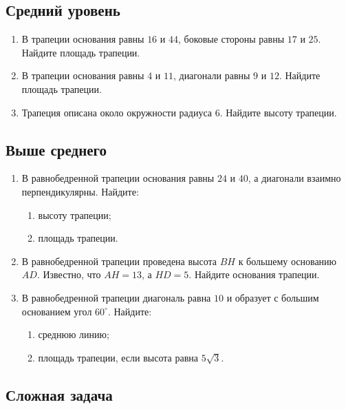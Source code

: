 \documentclass[a4paper,12pt]{article}
\begin{document}
\subsection*{\textcolor{accent}{Средний уровень}}

\begin{enumerate}[label=\textbf{\arabic*.},start=4]
    \item В трапеции основания равны $16$ и $44$, боковые стороны равны $17$ и $25$. Найдите площадь трапеции.

    \item В трапеции основания равны $4$ и $11$, диагонали равны $9$ и $12$. Найдите площадь трапеции.

    \item Трапеция описана около окружности радиуса $6$. Найдите высоту трапеции.
\end{enumerate}

\subsection*{\textcolor{accent}{Выше среднего}}

\begin{enumerate}[label=\textbf{\arabic*.},start=7]
    \item В равнобедренной трапеции основания равны $24$ и $40$, а диагонали взаимно перпендикулярны. Найдите:
    \begin{enumerate}[label=\asbuk*)]
        \item высоту трапеции;
        \item площадь трапеции.
    \end{enumerate}

    \item В равнобедренной трапеции проведена высота $BH$ к большему основанию $AD$. Известно, что $AH=13$, а $HD=5$. Найдите основания трапеции.

    \item В равнобедренной трапеции диагональ равна $10$ и образует с большим основанием угол $60^\circ$. Найдите:
    \begin{enumerate}[label=\asbuk*)]
        \item среднюю линию;
        \item площадь трапеции, если высота равна $5\sqrt{3}$.
    \end{enumerate}
\end{enumerate}

\subsection*{\textcolor{accent}{Сложная задача}}
\end{document}

